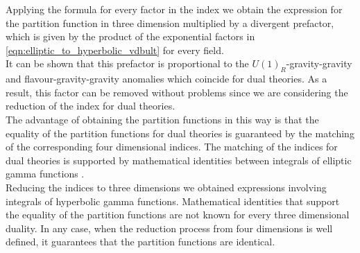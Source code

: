Applying the formula for every factor in the index we obtain the expression for the partition function in three dimension multiplied by a divergent prefactor, which is given by the product of the exponential factors in \eqref{eqn:elliptic_to_hyperbolic_vdbult} for every field.\\
It can be shown \cite{Aharony:2013dha} that this prefactor is proportional to the $U(1)_R$-gravity-gravity and flavour-gravity-gravity anomalies which coincide for dual theories.
As a result, this factor can be removed without problems since we are considering the reduction of the index for dual theories.\\
The advantage of obtaining the partition functions in this way is that the equality of the partition functions for dual theories is guaranteed by the matching of the corresponding four dimensional indices.
The matching of the indices for dual theories is supported by mathematical identities  between integrals of elliptic gamma functions \cite{rains309252transformations}.
\\
Reducing the indices to three dimensions we obtained expressions involving integrals of hyperbolic gamma functions. 
Mathematical identities that support the equality of the partition functions \cite{vanDeBult:2007} are not known for every three dimensional duality.
In any case, when the reduction process from four dimensions is well defined, it guarantees that the partition functions are identical.






